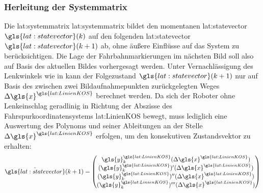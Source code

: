 \subsubsection{Herleitung der Systemmatrix}
Die \glsdesc{lat:systemmatrix} \gls{lat:systemmatrix} bildet den momentanen \glsdesc{lat:statevector} \(\gls{lat:statevector}(\scl{k})\) auf den folgenden \glsdesc{lat:statevector} \(\gls{lat:statevector}(\scl{k}+1)\) ab, ohne äußere Einflüsse auf das System zu berücksichtigen. Die Lage der Fahrbahnmarkierungen im nächsten Bild soll also auf Basis des aktuellen Bildes vorhergesagt werden.
Unter Vernachlässigung des Lenkwinkels wie in \autocite[48]{petersfalkoFPGAbasierteBildverarbeitungspipelineZur2009} kann der Folgezustand  \(\gls{lat:statevector}(\scl{k}+1)\) nur auf Basis des zwischen zwei Bildaufnahmepunkten zurückgelegten Weges \(\scl{\Delta\gls{x}}^{\gls{lat:LinienKOS}}\) berechnet werden. Da sich der Roboter ohne Lenkeinschlag geradlinig in Richtung der Abszisse des Fahrspurkoordinatensystems \gls{lat:LinienKOS} bewegt, muss lediglich eine Auswertung des Polynoms und seiner Ableitungen an der Stelle \(\scl{\Delta\gls{x}}^{\gls{lat:LinienKOS}}\) erfolgen, um den konsekutiven Zustandsvektor zu erhalten:
\begin{equation}
\label{eq:nextstatemapping}
\hat{\gls{lat:statevector}}(\scl{k}+1) =
\begin{pmatrix}
\gls{y}^{\gls{lat:LinienKOS}}_{\scl{k}}(\scl{\Delta\gls{x}}^{\gls{lat:LinienKOS}}) \\
\der{(\gls{y}^{\gls{lat:LinienKOS}}_{\scl{k}})}(\scl{\Delta\gls{x}}^{\gls{lat:LinienKOS}}) \\
\derII{(\gls{y}^{\gls{lat:LinienKOS}}_{\scl{k}})}(\scl{\Delta\gls{x}}^{\gls{lat:LinienKOS}}) \\
\derIII{(\gls{y}^{\gls{lat:LinienKOS}}_{\scl{k}})}(\scl{\Delta\gls{x}}^{\gls{lat:LinienKOS}}) \\
\end{pmatrix}
\end{equation}

